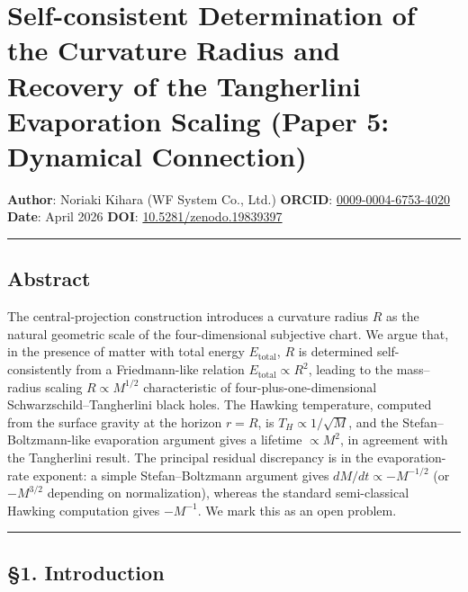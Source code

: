 \documentclass[a4paper,11pt]{article}
\theoremstyle{definition}
\begin{document}
\section{Self-consistent Determination of the Curvature Radius and
Recovery of the Tangherlini Evaporation Scaling (Paper 5: Dynamical
Connection)}\label{self-consistent-determination-of-the-curvature-radius-and-recovery-of-the-tangherlini-evaporation-scaling-paper-5-dynamical-connection}

\textbf{Author}: Noriaki Kihara (WF System Co., Ltd.) \textbf{ORCID}:
\href{https://orcid.org/0009-0004-6753-4020}{0009-0004-6753-4020}
\textbf{Date}: April 2026 \textbf{DOI}:
\href{https://doi.org/10.5281/zenodo.19839397}{10.5281/zenodo.19839397}

\begin{center}\rule{0.5\linewidth}{0.5pt}\end{center}

\subsection{Abstract}\label{abstract}

The central-projection construction introduces a curvature radius \(R\)
as the natural geometric scale of the four-dimensional subjective chart.
We argue that, in the presence of matter with total energy
\(E_{\mathrm{total}}\), \(R\) is determined self-consistently from a
Friedmann-like relation \(E_{\mathrm{total}} \propto R^2\), leading to
the mass--radius scaling \(R \propto M^{1/2}\) characteristic of
four-plus-one-dimensional Schwarzschild--Tangherlini black holes. The
Hawking temperature, computed from the surface gravity at the horizon
\(r = R\), is \(T_H \propto 1/\sqrt{M}\), and the Stefan--Boltzmann-like
evaporation argument gives a lifetime \(\propto M^2\), in agreement with
the Tangherlini result. The principal residual discrepancy is in the
evaporation-rate exponent: a simple Stefan--Boltzmann argument gives
\(dM/dt \propto -M^{-1/2}\) (or \(-M^{3/2}\) depending on
normalization), whereas the standard semi-classical Hawking computation
gives \(-M^{-1}\). We mark this as an open problem.

\begin{center}\rule{0.5\linewidth}{0.5pt}\end{center}

\subsection{§1. Introduction}\label{introduction}
\end{document}
